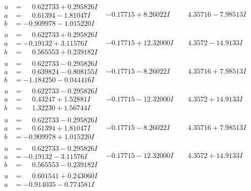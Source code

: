 \documentclass[1p]{elsarticle_modified}
\theoremstyle{definition}
\begin{document}
$$\begin{array}{c|c|c}
 \hline 
\begin{aligned}
u &= \phantom{-}0.622733 + 0.295826 I \\
a &= \phantom{-}0.61394 - 1.81047 I \\
b &= -0.909978 - 1.015220 I\end{aligned}
 & -0.17715 + 8.26022 I & \phantom{-}4.35716 - 7.98513 I \\ \hline\begin{aligned}
u &= \phantom{-}0.622733 + 0.295826 I \\
a &= -0.19132 + 3.11576 I \\
b &= \phantom{-}0.565553 + 0.239182 I\end{aligned}
 & -0.17715 + 12.32000 I & \phantom{-}4.3572 - 14.9133 I \\ \hline\begin{aligned}
u &= \phantom{-}0.622733 - 0.295826 I \\
a &= \phantom{-}0.639824 - 0.808155 I \\
b &= -1.184250 - 0.044416 I\end{aligned}
 & -0.17715 - 8.26022 I & \phantom{-}4.35716 + 7.98513 I \\ \hline\begin{aligned}
u &= \phantom{-}0.622733 - 0.295826 I \\
a &= \phantom{-}0.43247 + 1.52881 I \\
b &= \phantom{-}1.32230 + 1.56744 I\end{aligned}
 & -0.17715 - 12.32000 I & \phantom{-}4.3572 + 14.9133 I \\ \hline\begin{aligned}
u &= \phantom{-}0.622733 - 0.295826 I \\
a &= \phantom{-}0.61394 + 1.81047 I \\
b &= -0.909978 + 1.015220 I\end{aligned}
 & -0.17715 - 8.26022 I & \phantom{-}4.35716 + 7.98513 I \\ \hline\begin{aligned}
u &= \phantom{-}0.622733 - 0.295826 I \\
a &= -0.19132 - 3.11576 I \\
b &= \phantom{-}0.565553 - 0.239182 I\end{aligned}
 & -0.17715 - 12.32000 I & \phantom{-}4.3572 + 14.9133 I \\ \hline\begin{aligned}
u &= \phantom{-}0.601541 + 0.243060 I \\
a &= -0.914035 - 0.774581 I \\

\end{aligned}
\end{array}$$
\end{document}
